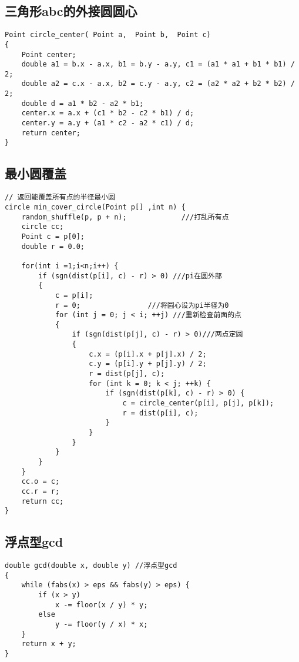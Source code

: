 \subsection{三角形abc的外接圆圆心}
\begin{lstlisting}
Point circle_center( Point a,  Point b,  Point c)
{
	Point center;
	double a1 = b.x - a.x, b1 = b.y - a.y, c1 = (a1 * a1 + b1 * b1) / 2;
	double a2 = c.x - a.x, b2 = c.y - a.y, c2 = (a2 * a2 + b2 * b2) / 2;
	double d = a1 * b2 - a2 * b1;
	center.x = a.x + (c1 * b2 - c2 * b1) / d;
	center.y = a.y + (a1 * c2 - a2 * c1) / d;
	return center;
}
\end{lstlisting}

\subsection{最小圆覆盖}
\begin{lstlisting}
// 返回能覆盖所有点的半径最小圆
circle min_cover_circle(Point p[] ,int n) {
	random_shuffle(p, p + n);             ///打乱所有点
	circle cc;
	Point c = p[0];
	double r = 0.0;

	for(int i =1;i<n;i++) {
		if (sgn(dist(p[i], c) - r) > 0) ///pi在圆外部
		{
			c = p[i];
			r = 0;                ///将圆心设为pi半径为0
			for (int j = 0; j < i; ++j) ///重新检查前面的点
			{
				if (sgn(dist(p[j], c) - r) > 0)///两点定圆
				{
					c.x = (p[i].x + p[j].x) / 2;
					c.y = (p[i].y + p[j].y) / 2;
					r = dist(p[j], c);
					for (int k = 0; k < j; ++k) {
						if (sgn(dist(p[k], c) - r) > 0) {
							c = circle_center(p[i], p[j], p[k]);
							r = dist(p[i], c);
						}
					}
				}
			}
		}
	}
	cc.o = c;
	cc.r = r;
	return cc;
}
\end{lstlisting}

\subsection{浮点型gcd}
\begin{lstlisting}
double gcd(double x, double y) //浮点型gcd
{
	while (fabs(x) > eps && fabs(y) > eps) {
		if (x > y)
			x -= floor(x / y) * y;
		else
			y -= floor(y / x) * x;
	}
	return x + y;
}
\end{lstlisting}

